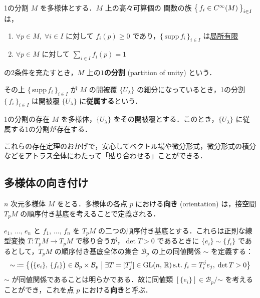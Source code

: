 \documentclass[geometry_main]{subfiles}
\begin{document}
\begin{mydef}[label=partition_unity]{1の分割}
	$M$ を\cinfty 多様体とする．$M$ 上の高々可算個の \cinfty 関数の族 $\bigl\{\, f_i \in C^\infty(M) \,\bigr\}_{i \in I} $ は，
	\begin{enumerate} 
		\item $\forall p \in M,\; \forall i \in I$ に対して $f_i (p) \ge 0$ であり，$\bigl\{\, \mathrm{supp}\, f_i \,\bigr\}_{i \in I}$ は\hyperref[def:locally-finite]{局所有限}
		\item $\forall p \in M$ に対して $\sum_{i \in I} f_i(p) = 1$
	\end{enumerate}
	の2条件を充たすとき，$M$ 上の\textbf{$1$の分割} (partition of unity) という．

	その上 $\bigl\{\, \mathrm{supp}\, f_i \,\bigr\}_{i \in I}$ が $M$ の開被覆 $\{ U_\lambda\}$ の細分になっているとき，1の分割 $\bigl\{\, f_i \,\bigr\}_{i \in I} $ は開被覆 $\{ U_\lambda \}$ に\textbf{従属する}という．
\end{mydef}

\begin{mytheo}[]{1の分割の存在}
	$M$ を\cinfty 多様体，$\{U_\lambda\}$ をその開被覆とする．このとき，$\{U_\lambda\}$ に従属する1の分割が存在する．
\end{mytheo}

これらの存在定理のおかげで，安心してベクトル場や微分形式，微分形式の積分などをアトラス全体にわたって「貼り合わせる」ことができる．

\subsection{多様体の向き付け}

$n$ 次元多様体 $M$ をとる．多様体の各点 $p$ における\textbf{向き} (orientation) は，接空間 $T_pM$ の順序付き基底を考えることで定義される．

$e_1,\, \dots ,\, e_n$ と $f_1,\, \dots ,\, f_n$ を $T_pM$ の二つの順序付き基底とする．これらは正則な線型変換 $T \colon T_p M \to T_pM$ で移り合うが，$\det T > 0$ であるときに $\{ e_i \} \sim \{f_i\}$ であるとして，$T_pM$ の順序付き基底全体の集合 $\mathcal{B}_p$ の上の同値関係 $\sim$ を定義する：
\begin{align} 
	\sim \; \coloneqq \bigl\{ \bigl(\{e_i\},\, \{f_i\}\bigr) \in \mathcal{B}_p \times \mathcal{B}_p \bigm| \exists T = [T^i_j] \in \mathrm{GL}(n,\, \mathbb{R})\, \mathrm{s.t.}\, f_i = T^j_i e_j,\; \det T > 0 \bigr\} 
\end{align}
$\sim$ が同値関係であることは明らかである．故に同値類 $[\{ e_i \}] \in \mathcal{B}_p /\mathord{\sim}$ を考えることができ，これを点 $p$ における\textbf{向き}と呼ぶ．
\end{document}
